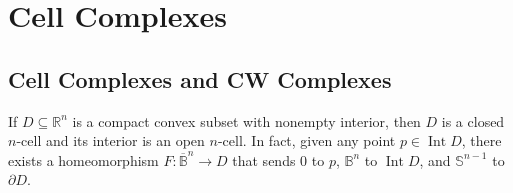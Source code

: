 \chapter{Cell Complexes}

\section{Cell Complexes and CW Complexes}

\begin{prop}{5.1}\label{prop:5.1}
	If \( D\subseteq \mathbb{R}^{n} \) is a compact convex subset with nonempty interior, then \( D \) is a closed \( n \)-cell and its interior is an open \( n \)-cell. In fact, given any point \( p \in \operatorname{Int}D \), there exists a homeomorphism \( F: \overline{\mathbb{B}}^{n} \to D \) that sends 0 to \( p \), \( \mathbb{B}^{n} \) to \( \operatorname{Int}D \), and \( \mathbb{S}^{n-1} \) to \( \partial D \).
\end{prop}

